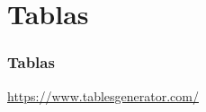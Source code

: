 \section{Tablas}

\begin{frame}
\frametitle{Tablas}

\centering
\url{https://www.tablesgenerator.com/}
    
\end{frame}